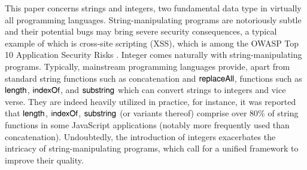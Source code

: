
This paper concerns strings and integers, two fundamental data type
in virtually all programming languages.
String-manipulating programs are notoriously subtle and their potential bugs %
may bring severe security consequences, a typical example of which is cross-site scripting
(XSS), which is among the OWASP Top 10 Application Security Risks
\cite{owasp17}. Integer  %
comes naturally with string-manipulating programs. %
Typically, mainstream programming languages provide, apart from standard string functions such as concatenation and $\mathsf{replaceAll}$, %
functions such as $\mathsf{length}$, $\mathsf{indexOf}$, and $\mathsf{substring}$ which can convert strings to integers and vice verse. %
They are indeed heavily utilized in practice, for instance, it was reported \cite{Berkeley-JavaScript} that $\mathsf{length}$, $\mathsf{indexOf}$, $\mathsf{substring}$ (or variants thereof) comprise over 80\% of string functions in some JavaScript applications (notably more frequently used than concatenation). Undoubtedly, the introduction of integers exacerbates the intricacy of string-manipulating programs, which call for a unified framework to improve their quality. 







